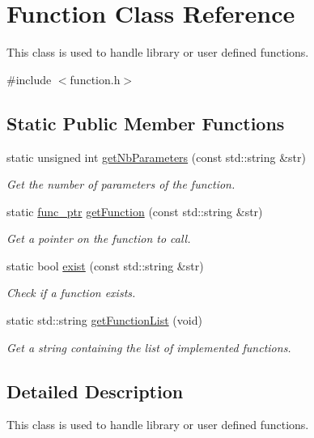 \hypertarget{class_function}{}\section{Function Class Reference}
\label{class_function}


This class is used to handle library or user defined functions.  




{\ttfamily \#include $<$function.\+h$>$}

\subsection*{Static Public Member Functions}
\begin{DoxyCompactItemize}
\item 
static unsigned int \hyperlink{class_function_a3cc694137e1698d0537d9e4672a7123a}{get\+Nb\+Parameters} (const std\+::string \&str)
\begin{DoxyCompactList}\small\item\em Get the number of parameters of the function. \end{DoxyCompactList}\item 
static \hyperlink{function_8h_a171e664ee3179d3d1f1a7b04a747724c}{func\+\_\+ptr} \hyperlink{class_function_a58dbf2a69e3cd7a82acff3ea70e642f4}{get\+Function} (const std\+::string \&str)
\begin{DoxyCompactList}\small\item\em Get a pointer on the function to call. \end{DoxyCompactList}\item 
static bool \hyperlink{class_function_a8f2dcc5ab81effb838f7a31203082b5f}{exist} (const std\+::string \&str)
\begin{DoxyCompactList}\small\item\em Check if a function exists. \end{DoxyCompactList}\item 
static std\+::string \hyperlink{class_function_a321f973005de0842251559fb2ab52160}{get\+Function\+List} (void)
\begin{DoxyCompactList}\small\item\em Get a string containing the list of implemented functions. \end{DoxyCompactList}\end{DoxyCompactItemize}


\subsection{Detailed Description}
This class is used to handle library or user defined functions. 

